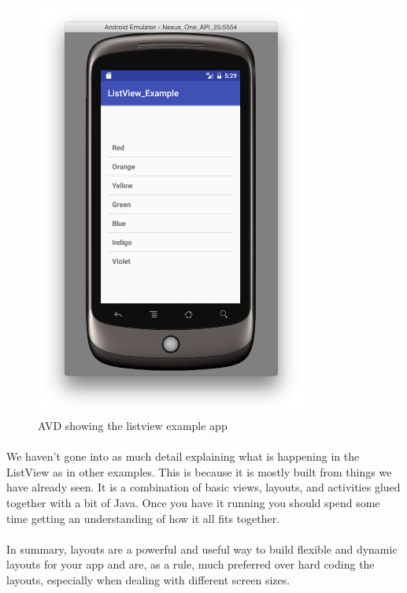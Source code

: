 \begin{figure}[H]
\centering
\includegraphics[width=0.8\textwidth]{images/listview_avd}
\caption{AVD showing the listview example app}
\label{fig:listview_avd}
\end{figure}


\paragraph{} We haven't gone into as much detail explaining what is happening in the ListView as in other examples. This is because it is mostly built from things we have already seen. It is a combination of basic views, layouts, and activities glued together with a bit of Java. Once you have it running you should spend some time getting an understanding of how it all fits together.

\paragraph{} In summary, layouts are a powerful and useful way to build flexible and dynamic layouts for your app and are, as a rule, much preferred over hard coding the layouts, especially when dealing with different screen sizes.



